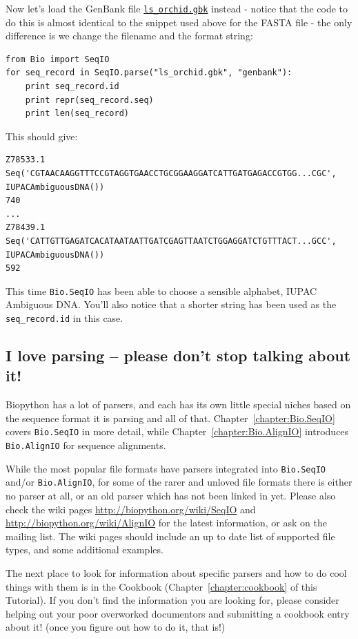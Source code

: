 \documentclass{report}
\begin{document}
Now let's load the GenBank file \href{http://biopython.org/DIST/docs/tutorial/examples/ls_orchid.gbk}{\tt ls\_orchid.gbk} instead - notice that the code to do this is almost identical to the snippet used above for the FASTA file - the only difference is we change the filename and the format string:

\begin{verbatim}
from Bio import SeqIO
for seq_record in SeqIO.parse("ls_orchid.gbk", "genbank"):
    print seq_record.id
    print repr(seq_record.seq)
    print len(seq_record)
\end{verbatim}

\noindent This should give:

\begin{verbatim}
Z78533.1
Seq('CGTAACAAGGTTTCCGTAGGTGAACCTGCGGAAGGATCATTGATGAGACCGTGG...CGC', IUPACAmbiguousDNA())
740
...
Z78439.1
Seq('CATTGTTGAGATCACATAATAATTGATCGAGTTAATCTGGAGGATCTGTTTACT...GCC', IUPACAmbiguousDNA())
592
\end{verbatim}

This time \verb|Bio.SeqIO| has been able to choose a sensible alphabet, IUPAC Ambiguous DNA.  You'll also notice that a shorter string has been used as the \verb|seq_record.id| in this case.

\subsection{I love parsing -- please don't stop talking about it!}

Biopython has a lot of parsers, and each has its own little special niches based on the sequence format it is parsing and all of that.  Chapter~\ref{chapter:Bio.SeqIO} covers \verb|Bio.SeqIO| in more detail, while Chapter~\ref{chapter:Bio.AlignIO} introduces \verb|Bio.AlignIO| for sequence alignments.

While the most popular file formats have parsers integrated into \verb|Bio.SeqIO| and/or \verb|Bio.AlignIO|, for some of the rarer and unloved file formats there is either no parser at all, or an old parser which has not been linked in yet.
Please also check the wiki pages \url{http://biopython.org/wiki/SeqIO} and \url{http://biopython.org/wiki/AlignIO} for the latest information, or ask on the mailing list. The wiki pages should include an up to date list of supported file types, and some additional  examples.

The next place to look for information about specific parsers and how to do cool things with them is in the Cookbook (Chapter~\ref{chapter:cookbook} of this Tutorial). If you don't find the information you are looking for, please consider helping out your poor overworked documentors and submitting a cookbook entry about it! (once you figure out how to do it, that is!)
\end{document}
